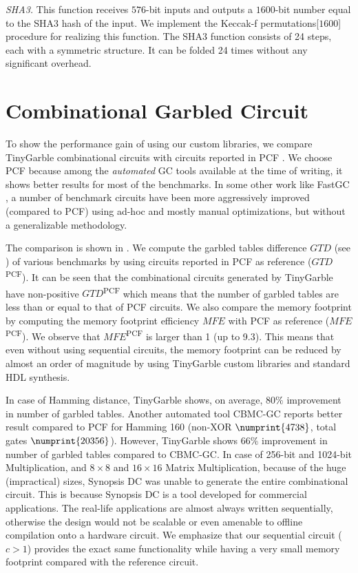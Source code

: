 \textit{SHA3.} This function receives $576$-bit inputs and outputs a $1600$-bit number equal to the SHA3 hash of the input.
We implement the Keccak-f permutations[$1600$] procedure for realizing this function.
The SHA3 function consists of 24 steps, each with a symmetric structure.
It can be folded 24 times without any significant overhead.

\section{Combinational Garbled Circuit}
To show the performance gain of using our custom libraries, we compare TinyGarble combinational circuits with circuits reported in PCF \cite{kreuter2013pcf}.
We choose PCF because among the \emph{automated} GC tools available at the time of writing, it shows better results for most of the benchmarks.
In some other work like FastGC \cite{huang2011faster}, a number of benchmark circuits have been more aggressively improved (compared to PCF) using ad-hoc and mostly manual optimizations, but without a generalizable methodology.

The comparison is shown in .
We compute the garbled tables difference $\mathit{GTD}$ (see ) of various benchmarks by using circuits reported in PCF as reference ($\mathit{GTD}$\textsuperscript{PCF}).
It can be seen that the combinational circuits generated by TinyGarble have non-positive $\mathit{GTD}$\textsuperscript{PCF} which means that the number of garbled tables are less than or equal to that of PCF circuits.
We also compare the memory footprint by computing the memory footprint efficiency $\mathit{MFE}$ with PCF as reference ($\mathit{MFE}$\textsuperscript{PCF}).
We observe that $\mathit{MFE}$\textsuperscript{PCF} is larger than 1 (up to 9.3).
This means that even without using sequential circuits, the memory footprint can be reduced by almost an order of magnitude by using TinyGarble custom libraries and standard HDL synthesis.

In case of Hamming distance, TinyGarble shows, on average, $80\%$ improvement in number of garbled tables.
Another automated tool CBMC-GC \cite{franz2014cbmc} reports better result compared to PCF for Hamming 160 (non-XOR $\numprint{4738}$, total gates $\numprint{20356}$).
However, TinyGarble shows $66\%$ improvement in number of garbled tables compared to CBMC-GC.
In case of 256-bit and 1024-bit Multiplication, and $8\times 8$ and $16\times 16$ Matrix Multiplication, because of the huge (impractical) sizes, Synopsis DC was unable to generate the entire combinational circuit.
This is because Synopsis DC is a tool developed for commercial applications.
The real-life applications are almost always written sequentially, otherwise the design would not be scalable or even amenable to offline compilation onto a hardware circuit.
We emphasize that our sequential circuit ($c>1$) provides the exact same functionality while having a very small memory footprint compared with the reference circuit.

